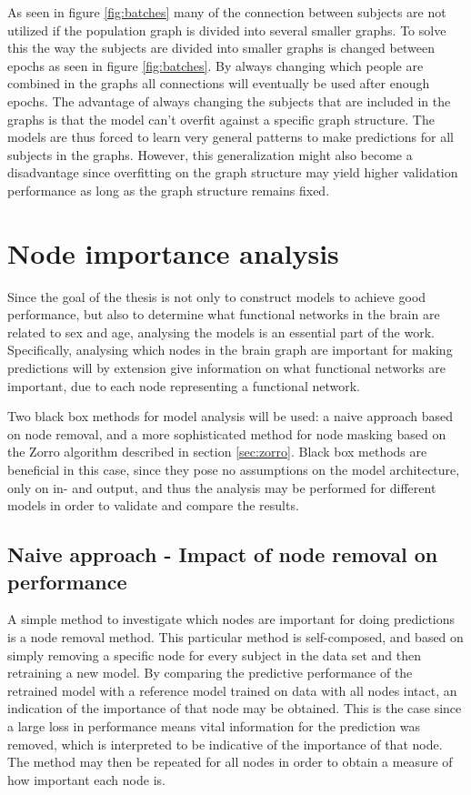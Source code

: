 As seen in figure \ref{fig:batches} many of the connection between subjects are not utilized if the population graph is divided into several smaller graphs. To solve this the way the subjects are divided into smaller graphs is changed between epochs as seen in figure \ref{fig:batches}. By always changing which people are combined in the graphs all connections will eventually be used after enough epochs. The advantage of always changing the subjects that are included in the graphs is that the model can't overfit against a specific graph structure. The models are thus forced to learn very general patterns to make predictions for all subjects in the graphs. However, this generalization might also become a disadvantage since overfitting on the graph structure may yield higher validation performance as long as the graph structure remains fixed. 


\section{Node importance analysis}
Since the goal of the thesis is not only to construct models to achieve good performance, but also to determine what functional networks in the brain are related to sex and age, analysing the models is an essential part of the work. Specifically, analysing which nodes in the brain graph are important for making predictions will by extension give information on what functional networks are important, due to each node representing a functional network. 

Two black box methods for model analysis will be used: a naive approach based on node removal, and a more sophisticated method for node masking based on the Zorro algorithm described in section \ref{sec:zorro}. Black box methods are beneficial in this case, since they pose no assumptions on the model architecture, only on in- and output, and thus the analysis may be performed for different models in order to validate and compare the results. 

\subsection{Naive approach - Impact of node removal on performance}
A simple method to investigate which nodes are important for doing predictions is a node removal method. This particular method is self-composed, and based on simply removing a specific node for every subject in the data set and then retraining a new model. By comparing the predictive performance of the retrained model with a reference model trained on data with all nodes intact, an indication of the importance of that node may be obtained. This is the case since a large loss in performance means vital information for the prediction was removed, which is interpreted to be indicative of the importance of that node. The method may then be repeated for all nodes in order to obtain a measure of how important each node is.

